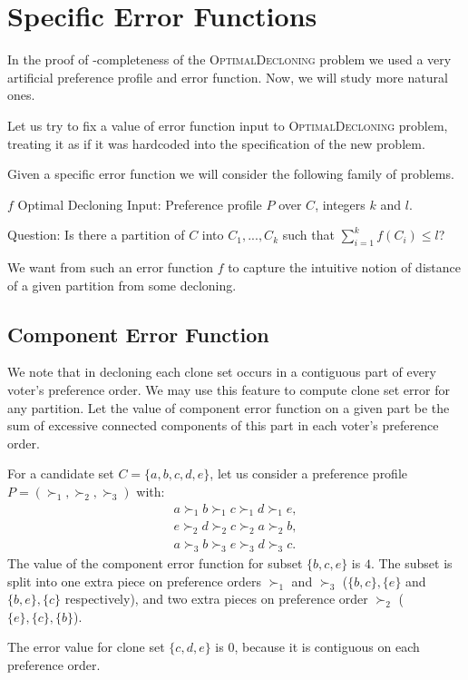 \section{Specific Error Functions}

In the proof of \np-completeness of the \textsc{OptimalDecloning} problem
we used a very artificial preference profile and error function.
Now, we will study more natural ones.

Let us try to fix a value of error function input to \textsc{OptimalDecloning} problem,
treating it as if it was hardcoded into the specification of the new problem.

Given a specific error function we will consider the following family of problems.

\begin{problem}{ $f$ Optimal Decloning}
	Input: Preference profile $P$ over $C$, integers $k$ and $l$.

	Question: Is there a partition of $C$ into $C_1, ..., C_k$ such that $\sum_{i=1}^k f(C_i) \leq l$?
\end{problem}

We want from such an error function $f$ to capture the intuitive notion
of distance of a given partition from some decloning.

\subsection{Component Error Function}

We note that in decloning each clone set occurs in a contiguous part of every voter's preference order.
We may use this feature to compute clone set error for any partition.
Let the value of component error function on a given part be the sum of excessive connected components
of this part in each voter's preference order.

\begin{exmp}
For a candidate set $C = \{a, b, c, d, e\}$,
let us consider a preference profile $P = (\succ_1, \succ_2, \succ_3)$ with:
\begin{align*}
a \succ_1 b \succ_1 c \succ_1 d \succ_1 e,\\
e \succ_2 d \succ_2 c \succ_2 a \succ_2 b,\\
a \succ_3 b \succ_3 e \succ_3 d \succ_3 c.
\end{align*}
The value of the component error function for subset $\{b,c,e\}$ is $4$.
The subset is split into one extra piece on preference orders $\succ_1$ and $\succ_3$
($\{b,c\}, \{e\}$ and $\{b,e\}, \{c\}$ respectively),
and two extra pieces on preference order $\succ_2$ ($\{e\}, \{c\}, \{b\}$).

The error value for clone set $\{c, d, e\}$ is $0$,
because it is contiguous on each preference order.
\end{exmp}

